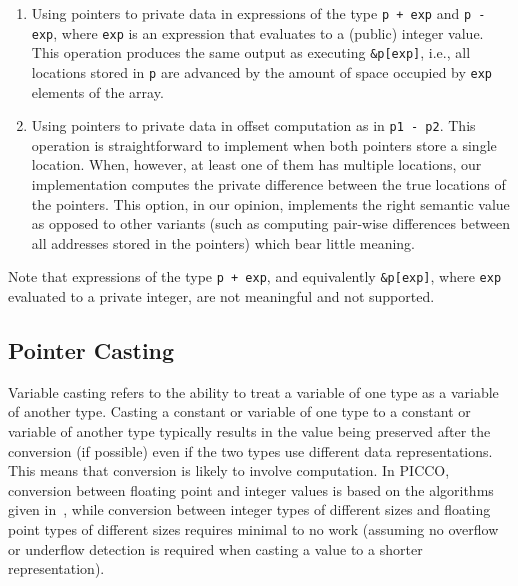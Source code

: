 \documentclass[11pt]{article}
\begin{document}
\begin{enumerate}
  \item Using pointers to private data in expressions of the type \texttt{p
      + exp} and \texttt{p - exp}, where \texttt{exp} is an expression that
      evaluates to a (public) integer value. This operation produces the
      same output as executing \texttt{\&p[exp]}, i.e., all locations stored
      in \texttt{p} are advanced by the amount of space occupied by
      \texttt{exp} elements of the array.
  \item Using pointers to private data in offset computation as in
    \texttt{p1 - p2}. This operation is straightforward to implement when
    both pointers store a single location. When, however, at least one of
    them has multiple locations, our implementation computes the private
    difference between the true locations of the pointers. This option, in
    our opinion, implements the right semantic value as opposed to other
    variants (such as computing pair-wise differences between all addresses
    stored in the pointers) which bear little meaning.
\end{enumerate}
Note that expressions of the type \texttt{p + exp}, and equivalently
\texttt{\&p[exp]}, where \texttt{exp} evaluated to a private integer, are
not meaningful and not supported. 

\subsection{Pointer Casting}

Variable casting refers to the ability to treat a variable of one type as a
variable of another type. Casting a constant or variable of one type to a
constant or variable of another type typically results in the value being
preserved after the conversion (if possible) even if the two types use
different data representations. This means that conversion is likely to
involve computation. In PICCO, conversion between floating point and integer
values is based on the algorithms given in~\cite{ali13}, while conversion
between integer types of different sizes and floating point types of
different sizes requires minimal to no work (assuming no overflow or
underflow detection is required when casting a value to a shorter
representation).
\end{document}
